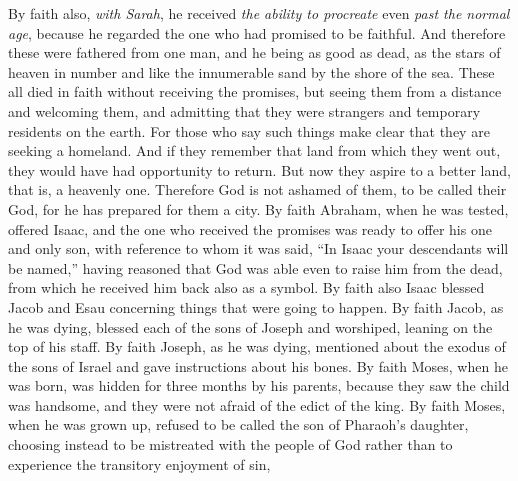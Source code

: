 \begin{biblechapter}
\verse By faith also, \textit{with Sarah}, he received \textit{the ability to procreate} even \textit{past the normal age}, because he regarded the one who had promised to be faithful.
\verse And therefore these were fathered from one man, and he being as good as dead, as the stars of heaven in number and like the innumerable sand by the shore of the sea.
\verse These all died in faith without receiving the promises, but seeing them from a distance and welcoming them, and admitting that they were strangers and temporary residents on the earth.
\verse For those who say such things make clear that they are seeking a homeland.
\verse And if they remember that land from which they went out, they would have had opportunity to return.
\verse But now they aspire to a better land, that is, a heavenly one. Therefore God is not ashamed of them, to be called their God, for he has prepared for them a city.
\verse By faith Abraham, when he was tested, offered Isaac, and the one who received the promises was ready to offer his one and only son,
\verse with reference to whom it was said, “In Isaac your descendants will be named,”
\verse having reasoned that God was able even to raise him from the dead, from which he received him back also as a symbol.
\verse By faith also Isaac blessed Jacob and Esau concerning things that were going to happen.
\verse By faith Jacob, as he was dying, blessed each of the sons of Joseph and worshiped, leaning on the top of his staff.
\verse By faith Joseph, as he was dying, mentioned about the exodus of the sons of Israel and gave instructions about his bones.
\verse By faith Moses, when he was born, was hidden for three months by his parents, because they saw the child was handsome, and they were not afraid of the edict of the king.
\verse By faith Moses, when he was grown up, refused to be called the son of Pharaoh’s daughter,
\verse choosing instead to be mistreated with the people of God rather than to experience the transitory enjoyment of sin,

\end{biblechapter}
